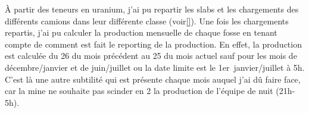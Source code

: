 À partir des teneurs en uranium, j'ai pu repartir les slabs et les chargements des différents camions dans leur différente classe (voir\ref{}). Une fois les chargements repartis, j'ai pu calculer la production mensuelle de chaque fosse en tenant compte de comment est fait le reporting de la production. En effet, la production est calculée du 26 du mois précédent au 25 du mois actuel sauf pour les mois de décembre/janvier et de juin/juillet ou la date limite est le 1er~janvier/juillet à 5h. C'est là une autre subtilité qui est présente chaque mois auquel j'ai dû faire face, car la mine ne souhaite pas scinder en 2 la production de l'équipe de nuit (21h-5h).